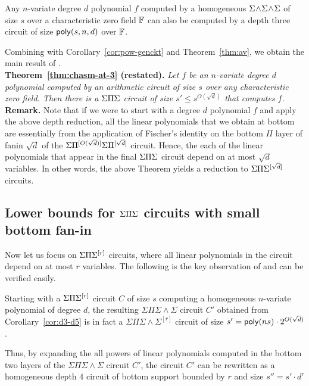\begin{lemma}
Any $n$-variate degree $d$ polynomial $f$ computed by a homogeneous $\Sigma\!\wedge\!\Sigma\!\wedge\!\Sigma$ of size $s$ over a characteristic zero field $\mathbb{F}$ can also be computed by a depth three circuit of size $\mathsf{poly}(s,n,d)$ over $\mathbb{F}$. 
\end{lemma}

Combining with Corollary~\ref{cor:pow-genckt} and Theorem~\ref{thm:av}, we obtain the main result of \cite{gkks13b}. \\

{\bf Theorem~\ref{thm:chasm-at-3} (restated). }{\em 
Let $f$ be an $n$-variate degree $d$ polynomial computed by an arithmetic circuit of size $s$ over any characteristic zero field. Then there is a $\Sigma\Pi\Sigma$ circuit of size $s' \leq s^{O(\sqrt{d})}$ that computes $f$. 
}\\

{\bf Remark. } Note that if we were to start with a degree $d$ polynomial $f$ and apply the above depth reduction, all the linear polynomials that we obtain at bottom are essentially from the application of Fischer's identity on the bottom $\Pi$ layer of fanin $\sqrt{d}$ of the $\Sigma\Pi^{[O(\sqrt{d})]}\Sigma\Pi^{[\sqrt{d}]}$ circuit. Hence, the each of the linear polynomials that appear in the final $\Sigma\Pi\Sigma$ circuit depend on at most $\sqrt{d}$ variables. In other words, the above Theorem yields a reduction to $\Sigma\Pi\Sigma^{[\sqrt{d}]}$ circuits. 

\subsection{Lower bounds for $\Sigma\Pi\Sigma$ circuits with small bottom fan-in}

Now let us focus on $\Sigma\Pi\Sigma^{[r]}$ circuits, where all linear polynomials in the circuit depend on at most $r$ variables. The following is the key observation of \cite{KayalSaha14} and can be verified easily. 

\begin{observation}
Starting with a $\Sigma\Pi\Sigma^{[r]}$ circuit $C$ of size $s$ computing a homogeneous $n$-variate polynomial of degree $d$, the resulting $\Sigma\Pi\Sigma\!\wedge\!\Sigma$ circuit $C'$ obtained from Corollary~\ref{cor:d3-d5} is in fact a 
$\Sigma\Pi\Sigma\!\wedge\!\Sigma^{[r]}$ circuit of size $s' = \mathsf{poly}(ns) \cdot 2^{O(\sqrt{d})}$. 

Thus, by expanding the all powers of linear polynomials computed in the bottom two layers of the $\Sigma\Pi\Sigma\!\wedge\!\Sigma$ circuit $C'$, the circuit $C'$ can be rewritten as a homogeneous depth $4$ circuit of bottom support bounded by $r$ and  size $s'' = s' \cdot d^r$
\end{observation}

